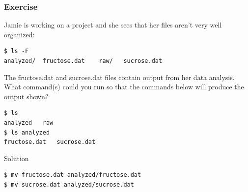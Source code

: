 \documentclass{beamer}
\begin{document}
\begin{frame}[fragile]
\frametitle{Exercise}
Jamie is working on a project and she sees that her files aren’t very well organized:
\begin{verbatim}
$ ls -F
analyzed/  fructose.dat    raw/   sucrose.dat
\end{verbatim}
The fructose.dat and sucrose.dat files contain output from her data analysis. 
What command(s) could you run so that the commands below will produce the output shown? 
\begin{verbatim}
$ ls
analyzed   raw
$ ls analyzed
fructose.dat   sucrose.dat
\end{verbatim}

\begin{block}{Solution}
\begin{verbatim}
$ mv fructose.dat analyzed/fructose.dat
$ mv sucrose.dat analyzed/sucrose.dat
\end{verbatim}
\end{block}
\end{frame}

\end{document}
